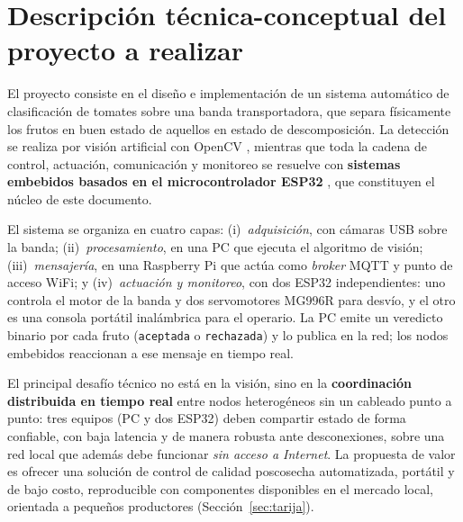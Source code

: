 \documentclass[12pt]{catolica_proyectos}
\begin{document}
\maketitle
\pagestyle{empty}
\tableofcontents
\newpage
\listoffigures
\newpage
\listoftables
\newpage

\setcounter{page}{1}

\section{Descripción técnica-conceptual del proyecto a realizar}

El proyecto consiste en el diseño e implementación de un sistema automático de clasificación de tomates sobre una banda transportadora, que separa físicamente los frutos en buen estado de aquellos en estado de descomposición. La detección se realiza por visión artificial con OpenCV \cite{opencv2024,gonzalez2018dip}, mientras que toda la cadena de control, actuación, comunicación y monitoreo se resuelve con \textbf{sistemas embebidos basados en el microcontrolador ESP32} \cite{espressif2023trm}, que constituyen el núcleo de este documento.

El sistema se organiza en cuatro capas: (i)~\emph{adquisición}, con cámaras USB sobre la banda; (ii)~\emph{procesamiento}, en una PC que ejecuta el algoritmo de visión; (iii)~\emph{mensajería}, en una Raspberry Pi que actúa como \emph{broker} MQTT \cite{light2017mosquitto} y punto de acceso WiFi; y (iv)~\emph{actuación y monitoreo}, con dos ESP32 independientes: uno controla el motor de la banda y dos servomotores MG996R para desvío, y el otro es una consola portátil inalámbrica para el operario. La PC emite un veredicto binario por cada fruto (\texttt{aceptada} o \texttt{rechazada}) y lo publica en la red; los nodos embebidos reaccionan a ese mensaje en tiempo real.

El principal desafío técnico no está en la visión, sino en la \textbf{coordinación distribuida en tiempo real} entre nodos heterogéneos sin un cableado punto a punto: tres equipos (PC y dos ESP32) deben compartir estado de forma confiable, con baja latencia y de manera robusta ante desconexiones, sobre una red local que además debe funcionar \emph{sin acceso a Internet}. La propuesta de valor es ofrecer una solución de control de calidad poscosecha automatizada, portátil y de bajo costo, reproducible con componentes disponibles en el mercado local, orientada a pequeños productores (Sección~\ref{sec:tarija}).
\end{document}
